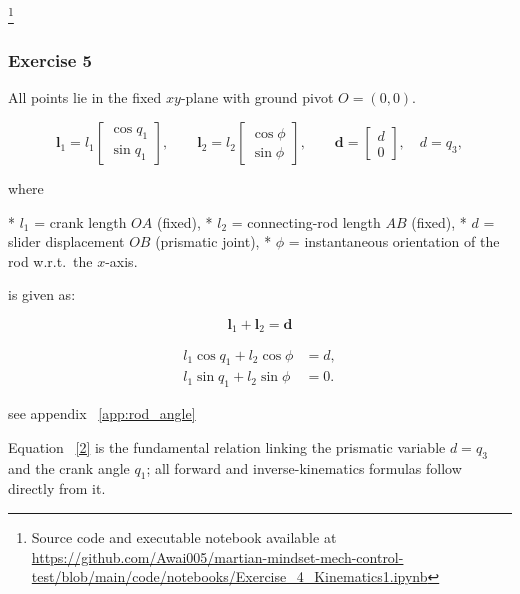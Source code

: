 \documentclass[12pt,a4paper]{article}
\begin{document}
\footnote{Source code and executable notebook available at
\url{https://github.com/Awai005/martian-mindset-mech-control-test/blob/main/code/notebooks/Exercise_4_Kinematics1.ipynb}}

\newpage

\subsubsection*{Exercise 5}



All points lie in the fixed \(xy\)-plane with ground pivot \(O=(0,0)\).

\[
\mathbf l_{1}
   = l_{1}
     \begin{bmatrix}
       \cos q_{1}\\[2pt]
       \sin q_{1}
     \end{bmatrix},
\qquad
\mathbf l_{2}
   = l_{2}
     \begin{bmatrix}
       \cos\phi\\[2pt]
       \sin\phi
     \end{bmatrix},
\qquad
\mathbf d
   =
     \begin{bmatrix}
       d\\[2pt] 0
     \end{bmatrix},
\quad
d=q_{3},
\]

where  

* \(l_{1}\) = crank length \(OA\) (fixed),  
* \(l_{2}\) = connecting-rod length \(AB\) (fixed),  
* \(d\)     = slider displacement \(OB\) (prismatic joint),  
* \(\phi\)  = instantaneous orientation of the rod w.r.t.\ the \(x\)-axis.  

\bigskip

 is given as:

\[
\;\mathbf l_{1} + \mathbf l_{2} = \mathbf d\;
\]


\label{eq:loopCoord}
\[
\begin{aligned}
l_{1}\cos q_{1} + l_{2}\cos\phi &= d, \\[2pt]
l_{1}\sin q_{1} + l_{2}\sin\phi &= 0.
\end{aligned}\tag{1}
\]

see appendix ~\ref{app:rod_angle}


Equation ~\eqref{2} is the fundamental relation linking
the prismatic variable \(d=q_{3}\) and the crank angle \(q_{1}\);
all forward and inverse-kinematics formulas follow directly from it.
\end{document}
